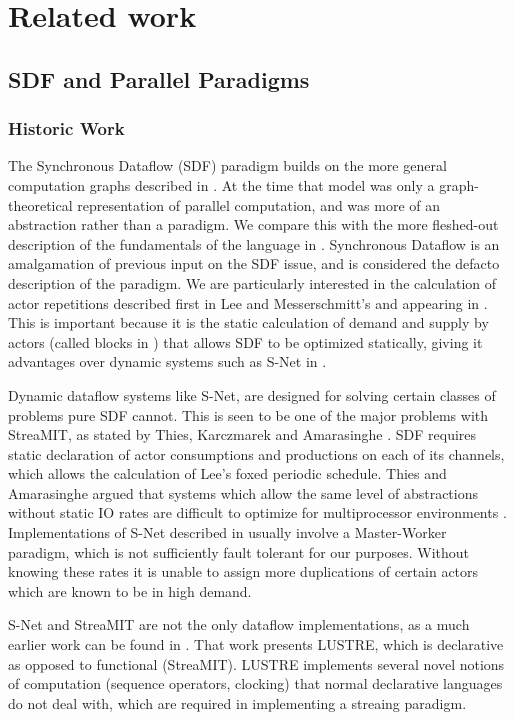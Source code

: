 \chapter{Related work}
\label{chapRelated}

\section{SDF and Parallel Paradigms}

\subsection{Historic Work}

The Synchronous Dataflow (SDF) paradigm builds on the more general computation graphs described in \cite{kar66}.
At the time that model was only a graph-theoretical representation of parallel computation, and was more of an abstraction rather than a paradigm.
We compare this with the more fleshed-out description of the fundamentals of the language in \cite{sdfBook}.
Synchronous Dataflow is an amalgamation of previous input on the SDF issue, and is considered the defacto description of the paradigm.
We are particularly interested in the calculation of actor repetitions described first in Lee and Messerschmitt's \cite{lee87} and appearing in \cite{sdfBook}.
This is important because it is the static calculation of demand and supply by actors (called blocks in \cite{lee87}) that allows SDF to be optimized statically, giving it advantages over dynamic systems such as S-Net in \cite{pen09}.

Dynamic dataflow systems like S-Net, are designed for solving certain classes of problems pure SDF cannot.
This is seen to be one of the major problems with StreaMIT, as stated by Thies, Karczmarek and Amarasinghe \cite{thies02}.
SDF requires static declaration of actor consumptions and productions on each of its channels, which allows the calculation of Lee's foxed periodic schedule.
Thies and Amarasinghe argued that systems which allow the same level of abstractions without static IO rates are difficult to optimize for multiprocessor environments \cite{thies10}.
Implementations of S-Net described in \cite{pen09} usually involve a Master-Worker paradigm, which is not sufficiently fault tolerant for our purposes.
Without knowing these rates it is unable to assign more duplications of certain actors which are known to be in high demand.

S-Net and StreaMIT are not the only dataflow implementations, as a much earlier work can be found in \cite{cas87}.
That work presents LUSTRE, which is declarative as opposed to functional (StreaMIT).
LUSTRE implements several novel notions of computation (sequence operators, clocking) that normal declarative languages do not deal with, which are required in implementing a streaing paradigm.

